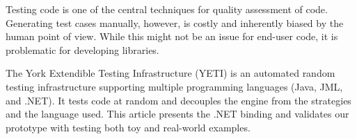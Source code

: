 Testing code is one of the central techniques for quality assessment of code. Generating 
test cases manually, however, is costly and inherently biased by the human point of view. While 
this might not be an issue for end-user code, it is problematic for developing libraries. 

The York Extendible Testing Infrastructure (YETI) is an automated random testing infrastructure
supporting multiple programming languages (Java, JML, and .NET). It tests code at random and 
decouples the engine from the strategies and the language used. This article presents
the .NET binding and validates our prototype with testing both toy and real-world examples.